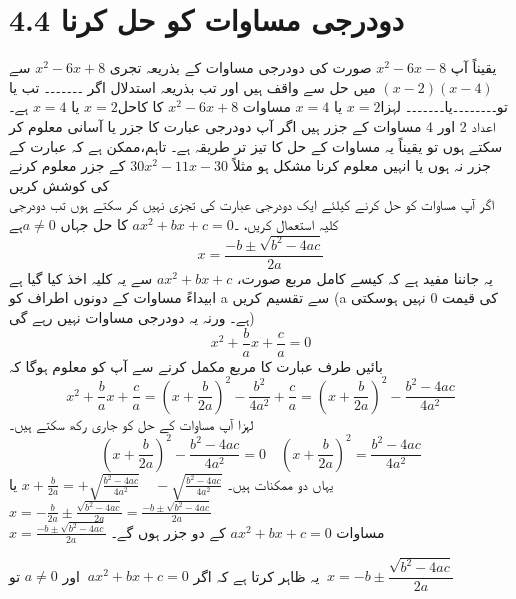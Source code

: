 \section*{ 4.4 دودرجی مساوات کو حل کرنا}
 یقیناً آپ  \(x^2-6x-8\) صورت کی دودرجی مساوات کے بذریعہ تجری \(x^2-6x+8\) سے  \((x-2)(x-4)\) میں حل سے واقف ہیں اور تب بذریعہ استدلال اگر ۔۔۔۔۔۔۔
 تب یا تو۔۔۔۔۔۔۔۔یا۔۔۔۔۔۔۔
 لہزا\( x=2\) یا \( x=4\)
 مساوات \(x^2-6x+8\) کا کاحل\( x=2\)  یا \( x=4\) ہے۔اعداد 2 اور 4 مساوات کے جزر ہیں
اگر آپ دودرجی عبارت کا جزر یا آسانی معلوم کر سکتے ہوں تو یقیناً یہ مساوات کے حل کا تیز تر طریقہ ہے۔
تاہم،ممکن ہے کہ عبارت کے جزر نہ ہوں یا انہیں معلوم کرنا مشکل ہو مثلاً  \(30x^{2}-11x-30\)  کے جزر معلوم کرنے کی کوشش کریں\\
 اگر آپ مساوات کو حل کرنے کیلئے ایک دودرجی عبارت کی تجزی نہیں کر سکتے ہوں تب دودرجی کلیہ استعمال کریں،
۔\(ax^{2}+bx+c=0\)  کا حل جہاں \(a\neq0\)ہے
\[x=\frac{-b\pm\sqrt{b^{2}-4ac}}{2a}\]
 یہ جاننا مفید ہے کہ کیسے کامل مربع صورت،  \(ax^{2}+bx+c\) سے یہ کلیہ اخذ کیا گیا ہے  ابیداءً مساوات کے دونوں اطراف کو a سے تقسیم کریں (a کی قیمت 0  نہیں ہوسکتی ہے۔ ورنہ یہ دودرجی مساوات نہیں رہے گی)
 \[x^{2}+\frac{b}{a}x+\frac{c}{a}=0\]
 \newpage
 بائیں طرف عبارت کا مربع مکمل کرنے سے آپ کو معلوم ہوگا کہ
\[x^{2}+\frac{b}{a}x+\frac{c}{a}=\left(x+\frac{b}{2a}\right)^{2}-\frac{b^{2}}{4a^{2}}+\frac{c}{a}=\left(x+\frac{b}{2a}\right)^{2}-\frac{b^{2}-4ac}{4a^{2}}\]
 لہزا آپ مساوات کے حل کو جاری رکھ سکتے ہیں۔
\[\left(x+\frac{b}{2a}\right)^{2}-\frac{b^{2}-4ac}{4a^{2}}=0\quad \left(x+\frac{b}{2a}\right)^{2}=\frac{b^{2}-4ac}{4a^{2}}\]
 یہاں دو ممکنات ہیں۔
 $x+\frac{b}{2a}=+\sqrt{\frac{b^{2}-4ac}{4a^{2}}}\quad-\sqrt{\frac{b^{2}-4ac}{4a^{2}}}$
 یا
$x=-\frac{b}{2a}\pm\frac{\sqrt{b^{2}-4ac}}{2a}=\frac{-b\pm\sqrt{b^{2}-4ac}}{2a}$
\\
$x=\frac{-b\pm\sqrt{b^{2}-4ac}}{2a}$
مساوات \(ax^2+bx+c=0\) کے دو جزر ہوں گے۔

یہ ظاہر کرتا ہے کہ اگر $ \ ax^{2} + bx+ c = 0 $ اور $a \neq 0 $ تو $\ x= -b \pm \dfrac{\sqrt{b^{2}-4ac}}{2a}$\\
